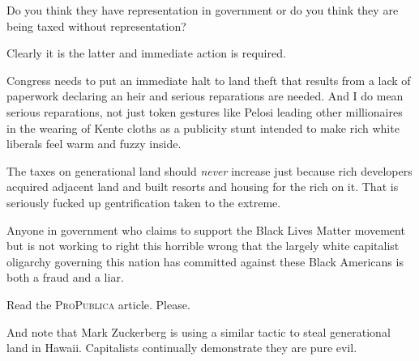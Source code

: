 Do you think they have representation in government or do you think they are being taxed without representation?

Clearly it is the latter and immediate action is required.

Congress needs to put an immediate halt to land theft that results from a lack of paperwork declaring an heir and serious reparations are needed. And I do mean serious reparations, not just token gestures like Pelosi leading other millionaires in the wearing of Kente cloths as a publicity stunt intended to make rich white liberals feel warm and fuzzy inside.

The taxes on generational land should \emph{never} increase just because rich developers acquired adjacent land and built resorts and housing for the rich on it. That is seriously fucked up gentrification taken to the extreme.

Anyone in government who claims to support the Black Lives Matter movement but is not working to right this horrible wrong that the largely white capitalist oligarchy governing this nation has committed against these Black Americans is both a fraud and a liar.

Read the \textsc{ProPublica} article. Please.

And note that Mark Zuckerberg is using a similar tactic to steal generational land in Hawaii. Capitalists continually demonstrate they are pure evil.
